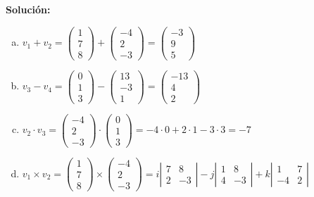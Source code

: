\documentclass[12pt]{article}
\newenvironment{solucion}
{\begin{mdframed}[backgroundcolor=black!10]
		{\bf Solución:}\\
	}
	{
	\end{mdframed}
}
\newenvironment{preguntas}
{\begin{enumerate}\itemsep12pt
	}
	{
	\end{enumerate}
}
\begin{document}
\begin{preguntas}
\begin{solucion}
\begin{enumerate}[a)]
\item $v_1 + v_2 =\begin{pmatrix}
				1\\
				7\\
				8
				\end{pmatrix} + \begin{pmatrix}
				-4\\
				2\\
				-3
				\end{pmatrix} = \begin{pmatrix}
				-3\\
				9\\
				5
				\end{pmatrix}$
\item $v_3 - v_4 = \begin{pmatrix}
				0\\
				1\\
				3
				\end{pmatrix} - \begin{pmatrix}
				13\\
				-3\\
				1
				\end{pmatrix} =  \begin{pmatrix}
				-13\\
				4\\
				2
				\end{pmatrix}$
\item $v_2 \cdot v_3 = \begin{pmatrix}
				-4\\
				2\\
				-3
				\end{pmatrix} \cdot \begin{pmatrix}
				0\\
				1\\
				3
				\end{pmatrix} = -4 \cdot 0 + 2 \cdot 1 -3 \cdot 3 = -7$
\item $v_1 \times v_2 = \begin{pmatrix}
				1\\
				7\\
				8
			\end{pmatrix} \times \begin{pmatrix}
				-4\\
				2\\
				-3
			\end{pmatrix} = i \left| \begin{matrix} 7 & 8 \\ 2 & -3\end{matrix} \right| - j \left| \begin{matrix} 1 & 8 \\ 4 & -3\end{matrix} \right| + k \left| \begin{matrix} 1 & 7 \\ -4 & 2\end{matrix} \right|$\\

\end{enumerate}
\end{solucion}
\end{preguntas}
\end{document}
